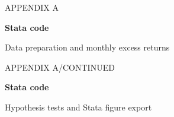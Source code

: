 \documentclass[11pt,letterpaper]{article}
\begin{document}
\newpage
{\small\color{muted}APPENDIX A}\par
{\Large\bfseries Stata code}\par
{\small\color{muted}Data preparation and monthly excess returns}

\newpage
{\small\color{muted}APPENDIX A\enspace /\enspace CONTINUED}\par
{\Large\bfseries Stata code}\par
{\small\color{muted}Hypothesis tests and Stata figure export}

\end{document}
